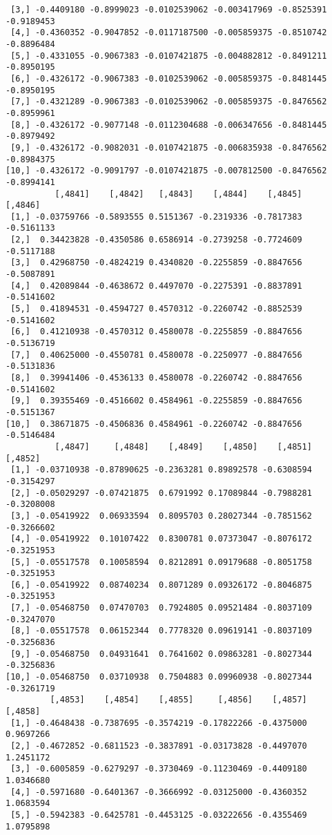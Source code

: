 \documentclass[
  letterpaper,
  DIV=11,
  numbers=noendperiod]{scrreprt}
\begin{document}
\begin{verbatim}
 [3,] -0.4409180 -0.8999023 -0.0102539062 -0.003417969 -0.8525391 -0.9189453
 [4,] -0.4360352 -0.9047852 -0.0117187500 -0.005859375 -0.8510742 -0.8896484
 [5,] -0.4331055 -0.9067383 -0.0107421875 -0.004882812 -0.8491211 -0.8950195
 [6,] -0.4326172 -0.9067383 -0.0102539062 -0.005859375 -0.8481445 -0.8950195
 [7,] -0.4321289 -0.9067383 -0.0102539062 -0.005859375 -0.8476562 -0.8959961
 [8,] -0.4326172 -0.9077148 -0.0112304688 -0.006347656 -0.8481445 -0.8979492
 [9,] -0.4326172 -0.9082031 -0.0107421875 -0.006835938 -0.8476562 -0.8984375
[10,] -0.4326172 -0.9091797 -0.0107421875 -0.007812500 -0.8476562 -0.8994141
          [,4841]    [,4842]   [,4843]    [,4844]    [,4845]    [,4846]
 [1,] -0.03759766 -0.5893555 0.5151367 -0.2319336 -0.7817383 -0.5161133
 [2,]  0.34423828 -0.4350586 0.6586914 -0.2739258 -0.7724609 -0.5117188
 [3,]  0.42968750 -0.4824219 0.4340820 -0.2255859 -0.8847656 -0.5087891
 [4,]  0.42089844 -0.4638672 0.4497070 -0.2275391 -0.8837891 -0.5141602
 [5,]  0.41894531 -0.4594727 0.4570312 -0.2260742 -0.8852539 -0.5141602
 [6,]  0.41210938 -0.4570312 0.4580078 -0.2255859 -0.8847656 -0.5136719
 [7,]  0.40625000 -0.4550781 0.4580078 -0.2250977 -0.8847656 -0.5131836
 [8,]  0.39941406 -0.4536133 0.4580078 -0.2260742 -0.8847656 -0.5141602
 [9,]  0.39355469 -0.4516602 0.4584961 -0.2255859 -0.8847656 -0.5151367
[10,]  0.38671875 -0.4506836 0.4584961 -0.2260742 -0.8847656 -0.5146484
          [,4847]     [,4848]    [,4849]    [,4850]    [,4851]    [,4852]
 [1,] -0.03710938 -0.87890625 -0.2363281 0.89892578 -0.6308594 -0.3154297
 [2,] -0.05029297 -0.07421875  0.6791992 0.17089844 -0.7988281 -0.3208008
 [3,] -0.05419922  0.06933594  0.8095703 0.28027344 -0.7851562 -0.3266602
 [4,] -0.05419922  0.10107422  0.8300781 0.07373047 -0.8076172 -0.3251953
 [5,] -0.05517578  0.10058594  0.8212891 0.09179688 -0.8051758 -0.3251953
 [6,] -0.05419922  0.08740234  0.8071289 0.09326172 -0.8046875 -0.3251953
 [7,] -0.05468750  0.07470703  0.7924805 0.09521484 -0.8037109 -0.3247070
 [8,] -0.05517578  0.06152344  0.7778320 0.09619141 -0.8037109 -0.3256836
 [9,] -0.05468750  0.04931641  0.7641602 0.09863281 -0.8027344 -0.3256836
[10,] -0.05468750  0.03710938  0.7504883 0.09960938 -0.8027344 -0.3261719
         [,4853]    [,4854]    [,4855]     [,4856]    [,4857]   [,4858]
 [1,] -0.4648438 -0.7387695 -0.3574219 -0.17822266 -0.4375000 0.9697266
 [2,] -0.4672852 -0.6811523 -0.3837891 -0.03173828 -0.4497070 1.2451172
 [3,] -0.6005859 -0.6279297 -0.3730469 -0.11230469 -0.4409180 1.0346680
 [4,] -0.5971680 -0.6401367 -0.3666992 -0.03125000 -0.4360352 1.0683594
 [5,] -0.5942383 -0.6425781 -0.4453125 -0.03222656 -0.4355469 1.0795898

\end{verbatim}
\end{document}
